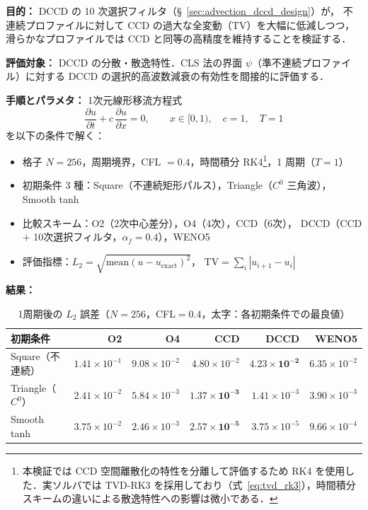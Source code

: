%

\noindent\textbf{目的：}
DCCD の 10 次選択フィルタ（§~\ref{sec:advection_dccd_design}）が，
不連続プロファイルに対して CCD の過大な全変動（TV）を大幅に低減しつつ，
滑らかなプロファイルでは CCD と同等の高精度を維持することを検証する．

\noindent\textbf{評価対象：}
DCCD の分散・散逸特性．CLS 法の界面 $\psi$（準不連続プロファイル）に対する
DCCD の選択的高波数減衰の有効性を間接的に評価する．

\noindent\textbf{手順とパラメタ：}
1次元線形移流方程式
\begin{equation}
  \frac{\partial u}{\partial t} + c\,\frac{\partial u}{\partial x} = 0,
  \qquad x \in [0,1),\quad c = 1,\quad T = 1
  \label{eq:linear_advection_dccd}
\end{equation}
を以下の条件で解く：
\begin{itemize}[noitemsep]
  \item 格子 $N=256$，周期境界，CFL $=0.4$，時間積分 RK4\footnote{本検証では CCD 空間離散化の特性を分離して評価するため RK4 を使用した．実ソルバでは TVD-RK3 を採用しており（式~\eqref{eq:tvd_rk3}），時間積分スキームの違いによる散逸特性への影響は微小である．}，1 周期（$T=1$）
  \item 初期条件 3 種：Square（不連続矩形パルス），Triangle（$C^0$ 三角波），Smooth tanh
  \item 比較スキーム：O2（2次中心差分），O4（4次），CCD（6次），
        DCCD（CCD $+$ 10次選択フィルタ，$\alpha_f=0.4$），WENO5
  \item 評価指標：$L_2 = \sqrt{\mathrm{mean}(u-u_\mathrm{exact})^2}$，
        $\mathrm{TV} = \sum_i |u_{i+1}-u_i|$
\end{itemize}

\noindent\textbf{結果：}

\begin{table}[htbp]
\centering
\caption{1周期後の $L_2$ 誤差（$N=256$，CFL$=0.4$，太字：各初期条件での最良値）}
\label{tab:dccd_l2_bench}
\renewcommand{\arraystretch}{1.3}
\begin{tabular}{lrrrrr}
\toprule
初期条件 & O2 & O4 & CCD & DCCD & WENO5 \\
\midrule
Square（不連続） & $1.41\times10^{-1}$ & $9.08\times10^{-2}$ & $4.80\times10^{-2}$ & $\mathbf{4.23\times10^{-2}}$ & $6.35\times10^{-2}$ \\
Triangle（$C^0$） & $2.41\times10^{-2}$ & $5.84\times10^{-3}$ & $\mathbf{1.37\times10^{-3}}$ & $1.41\times10^{-3}$ & $3.90\times10^{-3}$ \\
Smooth tanh & $3.75\times10^{-2}$ & $2.46\times10^{-3}$ & $\mathbf{2.57\times10^{-5}}$ & $3.75\times10^{-5}$ & $9.66\times10^{-4}$ \\
\bottomrule
\end{tabular}
\end{table}


